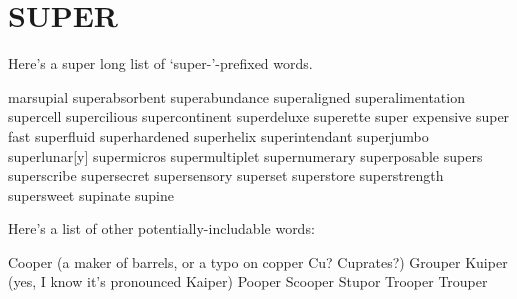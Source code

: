 \section{SUPER}
Here's a super long list of `super-'-prefixed words.

marsupial
superabsorbent
superabundance
superaligned
superalimentation
supercell
supercilious
supercontinent
superdeluxe
superette
super expensive
super fast
superfluid
superhardened
superhelix
superintendant
superjumbo
superlunar[y]
supermicros
supermultiplet
supernumerary
superposable
supers
superscribe
supersecret
supersensory
superset
superstore
superstrength
supersweet
supinate
supine

Here's a list of other potentially-includable words:

Cooper (a maker of barrels, or a typo on copper Cu?  Cuprates?)
Grouper
Kuiper (yes, I know it's pronounced Kaiper)
Pooper
Scooper
Stupor
Trooper
Trouper